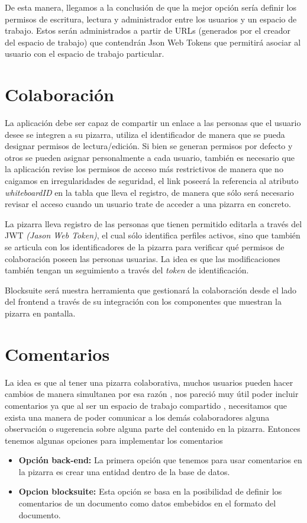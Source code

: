 \documentclass[a4paper, oneside, final]{scrartcl}
\begin{document}
De esta manera, llegamos a la conclusi\'on de que la mejor opci\'on ser\'ia definir los permisos de escritura, lectura y administrador entre los usuarios y un espacio de trabajo. Estos ser\'an administrados a partir de URLs (generados por el creador del espacio de trabajo) que contendr\'an Json Web Tokens que permitir\'a asociar al usuario con el espacio de trabajo particular.

\section{Colaboración}
La aplicación debe ser capaz de compartir un enlace a las personas que el usuario desee se integren a su pizarra, utiliza el identificador de manera que se pueda designar permisos de lectura/edición. Si bien se generan permisos por defecto y otros se pueden asignar personalmente a cada usuario, también es necesario que la aplicación revise los permisos de acceso más restrictivos de manera que no caigamos en irregularidades de seguridad, el link poseerá la referencia al atributo \textit{whiteboardID} en la tabla que lleva el registro, de manera que sólo será necesario revisar el acceso cuando un usuario trate de acceder a una pizarra en concreto.

La pizarra lleva registro de las personas que tienen permitido editarla a través del JWT \textit{(Jason Web Token)}, el cual sólo identifica perfiles activos, sino que también se articula con los identificadores de la pizarra para verificar qué permisos de colaboración poseen las personas usuarias. La idea es que las modificaciones también tengan un seguimiento a través del \textit{token} de identificación.

Blocksuite será nuestra herramienta que gestionará la colaboración desde el lado del frontend a través de su integración con los componentes que muestran la pizarra en pantalla.

\section{Comentarios}

La idea es que al tener una pizarra colaborativa, muchos usuarios pueden hacer cambios de manera simultanea por esa razón , nos pareció muy útil poder incluir comentarios ya que al ser un espacio de trabajo compartido , necesitamos que exista una manera de poder comunicar a los demás colaboradores alguna observación o sugerencia sobre alguna parte del contenido en la pizarra.
Entonces tenemos algunas opciones para implementar los comentarios
\begin{itemize}
    \item \textbf{Opción back-end:}
    La primera opción que tenemos para usar comentarios en la pizarra es crear una entidad dentro de la base de datos.
    \item \textbf{Opcion blocksuite:}
    Esta opción se basa en la posibilidad de definir los comentarios de un documento como datos embebidos en el formato del documento.
\end{itemize}
\end{document}
